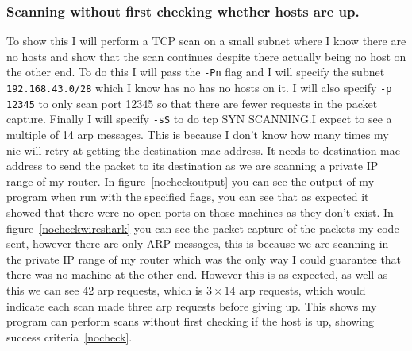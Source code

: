 \documentclass[titlepage]{article}
\let\Oldsubsubsection\subsubsection{}
\renewcommand{\subsubsection}{\FloatBarrier\Oldsubsubsection}
\begin{document}
\subsubsection{Scanning without first checking whether hosts are up.}
To show this I will perform a TCP scan on a small subnet where I
know there are no hosts and show that the scan continues despite there actually
being no host on the other end. To do this I will pass the \verb|-Pn| flag
and I will specify the subnet \verb|192.168.43.0/28| which I know has no has no hosts
on it. I will also specify \verb|-p 12345| to only scan port 12345 so that there are
fewer requests in the packet capture. Finally I will specify \verb|-sS| to do \gls{tcp}
SYN SCANNING.\@ I expect to see a multiple of 14 \gls{arp} messages.
This is because I don't know how many times my \gls{nic} will retry at getting
the destination \gls{mac} address. It needs to destination \gls{mac} address to send
the packet to its destination as we are scanning a private IP range of my router.
In figure~\ref{nocheckoutput} you can see the output of my program when run with the
specified flags, you can see that as expected it showed that there were no open ports
on those machines as they don't exist. In figure~\ref{nocheckwireshark} you can see the
packet capture of the packets my code sent, however there are only ARP messages, this is
because we are scanning in the private IP range of my router which was the only
way I could guarantee that there was no machine at the other end. However this is
as expected, as well as this we can see 42 \gls{arp} requests, which is $3\times14$
\gls{arp} requests, which would indicate each scan made three \gls{arp} requests before
giving up. This shows my program can perform scans without first checking if the host is
up, showing success criteria~\ref{nocheck}.
\end{document}

